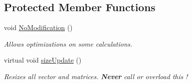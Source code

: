 \subsection*{Protected Member Functions}
\begin{DoxyCompactItemize}
\item 
void \mbox{\hyperlink{classKalman_1_1EKFilter_ae3350773ed390892c2dd6dfe9dfbca89}{No\+Modification}} ()
\begin{DoxyCompactList}\small\item\em Allows optimizations on some calculations. \end{DoxyCompactList}\item 
\mbox{\label{classKalman_1_1EKFilter_a63d12c3635dfb60459b214fb57167bc1}} 
virtual void \mbox{\hyperlink{classKalman_1_1EKFilter_a63d12c3635dfb60459b214fb57167bc1}{size\+Update}} ()
\begin{DoxyCompactList}\small\item\em Resizes all vector and matrices. {\bfseries Never} call or overload this ! \end{DoxyCompactList}\end{DoxyCompactItemize}
